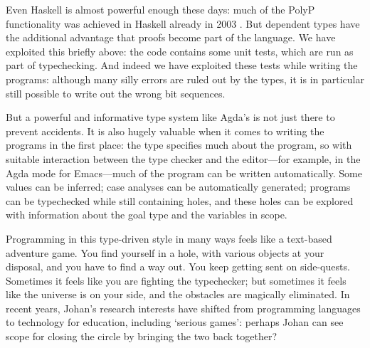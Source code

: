 \documentclass[fleqn,runningheads]{llncs}
\begin{document}
Even Haskell is almost powerful enough these days: much of the PolyP functionality was achieved in Haskell already in 2003 \cite{DBLP:conf/ifl/NorellJ03}. But dependent types have the additional advantage that proofs become part of the language. We have exploited this briefly above: the code contains some unit tests, which are run as part of typechecking. And indeed we have exploited these tests while writing the programs: although many silly errors are ruled out by the types, it is in particular still possible to write out the wrong bit sequences.

But a powerful and informative type system like Agda's is not just there to prevent accidents. It is also hugely valuable when it comes to writing the programs in the first place: the type specifies much about the program, so with suitable interaction between the type checker and the editor---for example, in the Agda mode for Emacs---much of the program can be written automatically. Some values can be inferred; case analyses can be automatically generated; programs can be typechecked while still containing holes, and these holes can be explored with information about the goal type and the variables in scope.

Programming in this type-driven style in many ways feels like a text-based adventure game. You find yourself in a hole, with various objects at your disposal, and you have to find a way out. You keep getting sent on side-quests. Sometimes it feels like you are fighting the typechecker; but sometimes it feels like the universe is on your side, and the obstacles are magically eliminated. In recent years, Johan's research interests have shifted from programming languages to technology for education, including `serious games': perhaps Johan can see scope for closing the circle by bringing the two back together?




\end{document}
